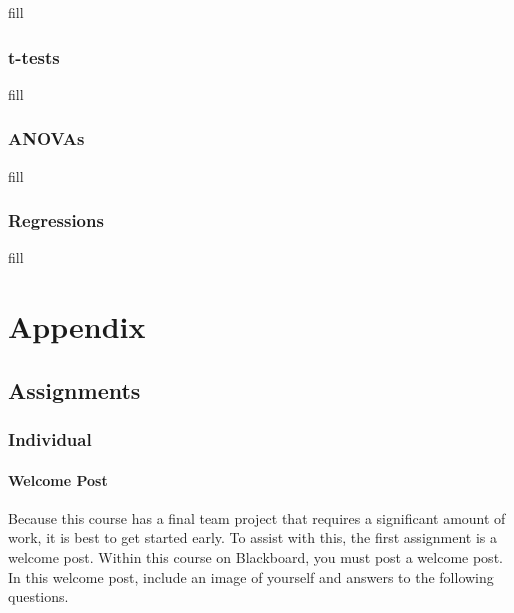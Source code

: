 \documentclass[
  b5paper]{book}
\begin{document}
fill

\hypertarget{t-tests}{%
\subsection*{t-tests}\label{t-tests}}

fill

\hypertarget{anovas}{%
\subsection*{ANOVAs}\label{anovas}}

fill

\hypertarget{regressions}{%
\subsection*{Regressions}\label{regressions}}

fill

\hypertarget{appendix}{%
\chapter{Appendix}\label{appendix}}

\hypertarget{assignments}{%
\section{Assignments}\label{assignments}}

\hypertarget{individual}{%
\subsection*{Individual}\label{individual}}

\hypertarget{welcome-post}{%
\subsubsection*{Welcome Post}\label{welcome-post}}

Because this course has a final team project that requires a significant amount of work, it is best to get started early. To assist with this, the first assignment is a welcome post. Within this course on Blackboard, you must post a welcome post. In this welcome post, include an image of yourself and answers to the following questions.
\end{document}
